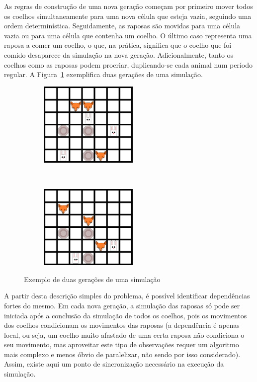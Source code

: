 \documentclass[10pt,a4paper,oneside]{article}
\begin{document}
As regras de construção de uma nova geração começam por primeiro mover
todos os coelhos simultaneamente para uma nova célula que esteja
vazia, seguindo uma ordem determinística. Seguidamente, as raposas são
movidas para uma célula vazia ou para uma célula que contenha um
coelho. O último caso representa uma raposa a comer um coelho, o que,
na prática, significa que o coelho que foi comido desaparece da
simulação na nova geração. Adicionalmente, tanto os coelhos como as
raposas podem procriar, duplicando-se cada animal num período
regular. A Figura~\ref{fig:sim} exemplifica duas gerações de uma
simulação.

\begin{figure}[H]
    \centering
    \begin{subfigure}[b]{0.4\textwidth}
      \centering
      \includegraphics[height=1.6in]{grid1.png}
    \end{subfigure}
    ~
    \begin{subfigure}[b]{0.4\textwidth}
      \centering
      \includegraphics[height=1.6in]{grid2.png}
    \end{subfigure}
    \caption{Exemplo de duas gerações de uma simulação}
    \label{fig:sim}
\end{figure}

A partir desta descrição simples do problema, é possível identificar
dependências fortes do mesmo. Em cada nova geração, a simulação das
raposas só pode ser iniciada após a conclusão da simulação de todos os
coelhos, pois os movimentos dos coelhos condicionam os movimentos das
raposas (a dependência é apenas local, ou seja, um coelho muito
afastado de uma certa raposa não condiciona o seu movimento, mas
aproveitar este tipo de observações requer um algoritmo mais complexo
e menos óbvio de paralelizar, não sendo por isso considerado). Assim,
existe aqui um ponto de sincronização necessário na execução da
simulação.
\end{document}
